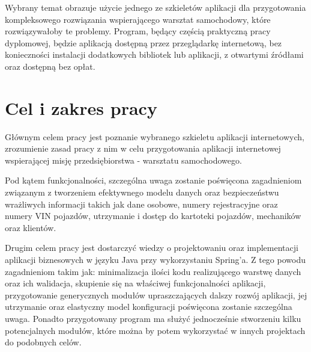 	Wybrany temat obrazuje użycie jednego ze szkieletów aplikacji dla przygotowania kompleksowego rozwiązania wspierającego warsztat samochodowy, które rozwiązywałoby te problemy. Program, będący częścią praktyczną pracy dyplomowej, będzie aplikacją dostępną przez przeglądarkę internetową, bez konieczności instalacji dodatkowych bibliotek lub aplikacji, z otwartymi źródłami oraz dostępną bez opłat. 

\section{Cel i zakres pracy}
	Głównym celem pracy jest poznanie wybranego szkieletu aplikacji internetowych, zrozumienie zasad pracy z nim w celu przygotowania aplikacji internetowej wspierającej misję przedsiębiorstwa - warsztatu samochodowego. 
	
	Pod kątem funkcjonalności, szczególna uwaga zostanie poświęcona zagadnieniom związanym z tworzeniem efektywnego modelu danych oraz bezpieczeństwu wrażliwych informacji takich jak dane osobowe, numery rejestracyjne oraz numery VIN pojazdów, utrzymanie i dostęp do kartoteki pojazdów, mechaników oraz klientów. 
	
	Drugim celem pracy jest dostarczyć wiedzy o projektowaniu oraz implementacji aplikacji biznesowych w języku Java przy wykorzystaniu Spring'a. Z tego powodu zagadnieniom takim jak: minimalizacja ilości kodu realizującego warstwę danych oraz ich walidacja, skupienie się na właściwej funkcjonalności aplikacji, przygotowanie generycznych modułów upraszczających dalszy rozwój aplikacji, jej utrzymanie oraz elastyczny model konfiguracji poświęcona zostanie szczególna uwaga. Ponadto przygotowany program ma służyć jednocześnie stworzeniu kilku potencjalnych modułów, które można by potem wykorzystać w innych projektach do podobnych celów.
	
	
		
